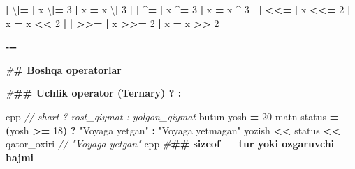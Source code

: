 \documentclass[a4paper,11pt,twoside,openright]{book}
\newenvironment{Shaded}{\begin{snugshade}}{\end{snugshade}}
\newcommand{\CommentTok}[1]{\textcolor[rgb]{0.56,0.35,0.01}{\textit{#1}}}
\newcommand{\DecValTok}[1]{\textcolor[rgb]{0.00,0.00,0.81}{#1}}
\newcommand{\ErrorTok}[1]{\textcolor[rgb]{0.64,0.00,0.00}{\textbf{#1}}}
\newcommand{\NormalTok}[1]{#1}
\newcommand{\OperatorTok}[1]{\textcolor[rgb]{0.81,0.36,0.00}{\textbf{#1}}}
\newcommand{\PreprocessorTok}[1]{\textcolor[rgb]{0.56,0.35,0.01}{\textit{#1}}}
\newcommand{\StringTok}[1]{\textcolor[rgb]{0.31,0.60,0.02}{#1}}
\begin{document}
\begin{Shaded}
\begin{Highlighting}[]
\OperatorTok{|} \ErrorTok{\textasciigrave{}}\NormalTok{\textbackslash{}}\OperatorTok{|=}\ErrorTok{\textasciigrave{}} \OperatorTok{|} \ErrorTok{\textasciigrave{}}\NormalTok{x \textbackslash{}}\OperatorTok{|=} \DecValTok{3}\ErrorTok{\textasciigrave{}} \OperatorTok{|} \ErrorTok{\textasciigrave{}}\NormalTok{x }\OperatorTok{=}\NormalTok{ x \textbackslash{}}\OperatorTok{|} \DecValTok{3}\ErrorTok{\textasciigrave{}} \OperatorTok{|}
\OperatorTok{|} \ErrorTok{\textasciigrave{}}\OperatorTok{\^{}=}\ErrorTok{\textasciigrave{}} \OperatorTok{|} \ErrorTok{\textasciigrave{}}\NormalTok{x }\OperatorTok{\^{}=} \DecValTok{3}\ErrorTok{\textasciigrave{}} \OperatorTok{|} \ErrorTok{\textasciigrave{}}\NormalTok{x }\OperatorTok{=}\NormalTok{ x }\OperatorTok{\^{}} \DecValTok{3}\ErrorTok{\textasciigrave{}} \OperatorTok{|}
\OperatorTok{|} \ErrorTok{\textasciigrave{}}\OperatorTok{\textless{}\textless{}=}\ErrorTok{\textasciigrave{}} \OperatorTok{|} \ErrorTok{\textasciigrave{}}\NormalTok{x }\OperatorTok{\textless{}\textless{}=} \DecValTok{2}\ErrorTok{\textasciigrave{}} \OperatorTok{|} \ErrorTok{\textasciigrave{}}\NormalTok{x }\OperatorTok{=}\NormalTok{ x }\OperatorTok{\textless{}\textless{}} \DecValTok{2}\ErrorTok{\textasciigrave{}} \OperatorTok{|}
\OperatorTok{|} \ErrorTok{\textasciigrave{}}\OperatorTok{\textgreater{}\textgreater{}=}\ErrorTok{\textasciigrave{}} \OperatorTok{|} \ErrorTok{\textasciigrave{}}\NormalTok{x }\OperatorTok{\textgreater{}\textgreater{}=} \DecValTok{2}\ErrorTok{\textasciigrave{}} \OperatorTok{|} \ErrorTok{\textasciigrave{}}\NormalTok{x }\OperatorTok{=}\NormalTok{ x }\OperatorTok{\textgreater{}\textgreater{}} \DecValTok{2}\ErrorTok{\textasciigrave{}} \OperatorTok{|}

\OperatorTok{{-}{-}{-}}

\PreprocessorTok{\#}\ErrorTok{\# Boshqa operatorlar}

\PreprocessorTok{\#}\ErrorTok{\#\# Uchlik operator (Ternary) \textasciigrave{}? :\textasciigrave{}}

\ErrorTok{\textasciigrave{}\textasciigrave{}\textasciigrave{}}\NormalTok{cpp}
\CommentTok{// shart ? rost\_qiymat : yolg\textquotesingle{}on\_qiymat}
\NormalTok{butun yosh }\OperatorTok{=} \DecValTok{20}
\NormalTok{matn status }\OperatorTok{=} \OperatorTok{(}\NormalTok{yosh }\OperatorTok{\textgreater{}=} \DecValTok{18}\OperatorTok{)} \OperatorTok{?} \StringTok{"Voyaga yetgan"} \OperatorTok{:} \StringTok{"Voyaga yetmagan"}
\NormalTok{yozish }\OperatorTok{\textless{}\textless{}}\NormalTok{ status }\OperatorTok{\textless{}\textless{}}\NormalTok{ qator\_oxiri   }\CommentTok{// "Voyaga yetgan"}
\ErrorTok{\textasciigrave{}\textasciigrave{}\textasciigrave{}}\NormalTok{cpp}
\PreprocessorTok{\#}\ErrorTok{\#\# \textasciigrave{}sizeof\textasciigrave{} — tur yoki o\textquotesingle{}zgaruvchi hajmi}


\end{Highlighting}
\end{Shaded}
\end{document}
